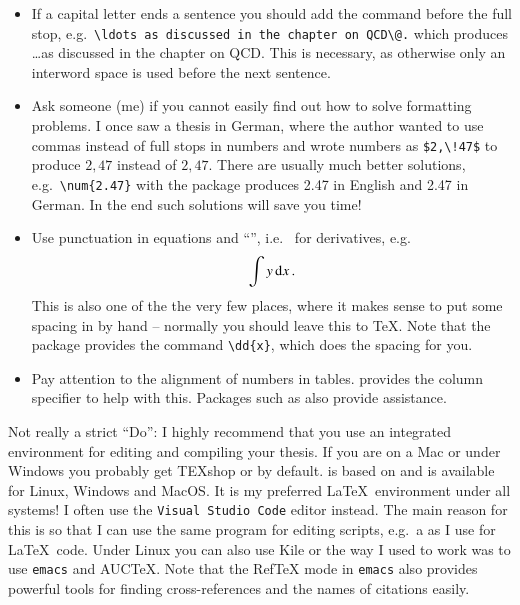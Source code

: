 \begin{itemize}
\item If a capital letter ends a sentence you should add the
  command  before the full stop, e.g.\
  \verb|\ldots as discussed in the chapter on QCD\@.| 
  which produces \ldots as discussed in the chapter on QCD\@.
  This is necessary, as otherwise only an interword space is used 
  before the next sentence.

\item Ask someone (me) if you cannot easily find out how to solve
  formatting problems. I once saw a thesis in German, where the
  author wanted to use commas instead of full stops in numbers and
  wrote numbers as \verb+$2,\!47$+ to produce $2,\!47$ instead of
  $2,47$. There are usually much better solutions, e.g.\
  \verb+\num{2.47}+ with the  package produces
  \num{2.47} in English and \foreignlanguage{ngerman}{\num{2.47}} in
  German. In the end such solutions will save you time!

\item Use punctuation in equations and \enquote{\dif}, i.e.\  for
  derivatives, e.g.
  \begin{equation*}
    \int y\, \text{d} x\,.
  \end{equation*}
  This is also one of the the very few places, where it makes sense
  to put some spacing in by hand -- normally you should leave this to \TeX.
  Note that the \Package{physics} package provides the command \verb|\dd{x}|,
  which does the spacing for you.
  
\item Pay attention to the alignment of numbers in
  tables.  provides the  column specifier to
  help with this. Packages such as  also provide assistance.
\end{itemize}

Not really a strict \enquote{Do}: I highly recommend that you use an
integrated environment for editing and compiling your thesis.
If you are on a Mac or under Windows you probably get TEXshop or
\TeXLive by default. 
\TeXstudio is based on \TeXmaker and is available for Linux,
Windows and MacOS\@.
It is my preferred \LaTeX\ environment under all systems!
I often use the \texttt{Visual Studio Code} editor instead.
The main reason for this is so that I can use the same program
for editing scripts, e.g.\ a \File{Makefile} as I use for \LaTeX\ code.
Under Linux you can also use Kile\index{kile} or the way I used to work
was to use \texttt{emacs}\index{emacs} and AUCTeX.
Note that the RefTeX\index{RefTeX} mode in \texttt{emacs} also provides powerful
tools for finding cross-references and the names of citations easily.

